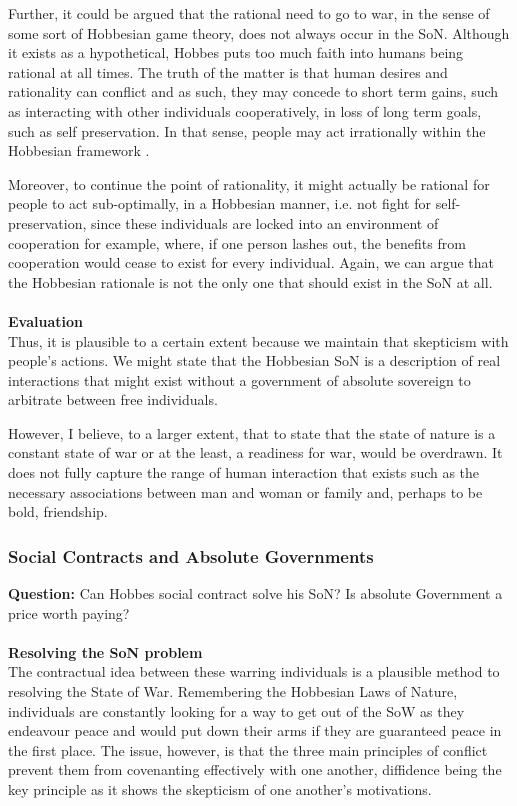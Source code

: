 \documentclass[12pt, letterpaper]{article}
\begin{document}
Further, it could be argued that the rational need to go to war, in the sense of some sort of Hobbesian game theory, does not always occur in the SoN. Although it exists as a hypothetical, Hobbes puts too much faith into humans being rational at all times. The truth of the matter is that human desires and rationality can conflict and as such, they may concede to short term gains, such as interacting with other individuals cooperatively, in loss of long term goals, such as self preservation. In that sense, people may act irrationally within the Hobbesian framework .

Moreover, to continue the point of rationality, it might actually be rational for people to act sub-optimally, in a Hobbesian manner, i.e. not fight for self-preservation, since these individuals are locked into an environment of cooperation for example, where, if one person lashes out, the benefits from cooperation would cease to exist for every individual. Again, we can argue that the Hobbesian rationale is not the only one that should exist in the SoN at all.\\\\
\textbf{Evaluation}\\
Thus, it is plausible to a certain extent because we maintain that skepticism with people's actions. We might state that the Hobbesian SoN is a description of real interactions that might exist without a government of absolute sovereign to arbitrate between free individuals.

However, I believe, to a larger extent, that to state that the state of nature is a constant state of war or at the least, a readiness for war, would be overdrawn. It does not fully capture the range of human interaction that exists such as the necessary associations between man and woman or family and, perhaps to be bold, friendship.

\subsubsection{Social Contracts and Absolute Governments}
\textbf{Question:} Can Hobbes social contract solve his SoN? Is absolute Government a price worth paying?\\\\
\textbf{Resolving the SoN problem}\\
The contractual idea between these warring individuals is a plausible method to resolving the State of War. Remembering the Hobbesian Laws of Nature, individuals are constantly looking for a way to get out of the SoW as they endeavour peace and would put down their arms if they are guaranteed peace in the first place. The issue, however, is that the three main principles of conflict prevent them from covenanting effectively with one another, diffidence being the key principle as it shows the skepticism of one another's motivations.
\end{document}
